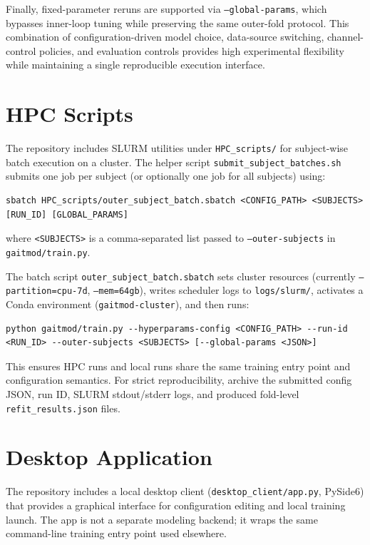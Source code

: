 Finally, fixed-parameter reruns are supported via \texttt{--global-params}, which bypasses inner-loop tuning while preserving the same outer-fold protocol. This combination of configuration-driven model choice, data-source switching, channel-control policies, and evaluation controls provides high experimental flexibility while maintaining a single reproducible execution interface.

\section{HPC Scripts}
\label{sec:reproducibility_hpc_scripts}
The repository includes SLURM utilities under \texttt{HPC\_scripts/} for subject-wise batch execution on a cluster. The helper script \texttt{submit\_subject\_batches.sh} submits one job per subject (or optionally one job for all subjects) using:
\begin{verbatim}
sbatch HPC_scripts/outer_subject_batch.sbatch <CONFIG_PATH> <SUBJECTS> [RUN_ID] [GLOBAL_PARAMS]
\end{verbatim}
where \texttt{<SUBJECTS>} is a comma-separated list passed to \texttt{--outer-subjects} in \texttt{gaitmod/train.py}.

The batch script \texttt{outer\_subject\_batch.sbatch} sets cluster resources (currently \texttt{--partition=cpu-7d}, \texttt{--mem=64gb}), writes scheduler logs to \texttt{logs/slurm/}, activates a Conda environment (\texttt{gaitmod-cluster}), and then runs:
\begin{verbatim}
python gaitmod/train.py --hyperparams-config <CONFIG_PATH> --run-id <RUN_ID> --outer-subjects <SUBJECTS> [--global-params <JSON>]
\end{verbatim}
This ensures HPC runs and local runs share the same training entry point and configuration semantics. For strict reproducibility, archive the submitted config JSON, run ID, SLURM stdout/stderr logs, and produced fold-level \texttt{refit\_results.json} files.

\section{Desktop Application}
\label{sec:reproducibility_desktop_app}
The repository includes a local desktop client (\texttt{desktop\_client/app.py}, PySide6) that provides a graphical interface for configuration editing and local training launch. The app is not a separate modeling backend; it wraps the same command-line training entry point used elsewhere.

